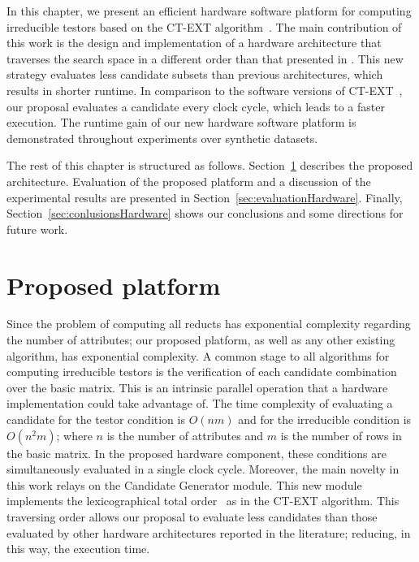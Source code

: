 \documentclass[letterpaper, twoside, openright, 12pt]{book}%
\begin{document}
	In this chapter, we present an efficient hardware software platform for computing irreducible testors based on the CT-EXT algorithm~\citep{Sanchez07}. The main contribution of this work is the design and implementation of a hardware architecture that traverses the search space in a different order than that presented in \citep{Rojas07, Rojas12,Rodriguez14}. This new strategy evaluates less candidate subsets than previous architectures, which results in shorter runtime. In comparison to the software versions of CT-EXT~\citep{Sanchez07, Sanchez10}, our proposal evaluates a candidate every clock cycle, which leads to a faster execution. The runtime gain of our new hardware software platform is demonstrated throughout experiments over synthetic datasets. 
	
	The rest of this chapter is structured as follows. Section~\ref{sec:platform} describes the proposed architecture. Evaluation of the proposed platform and a discussion of the experimental results are presented in Section~\ref{sec:evaluationHardware}. Finally, Section~\ref{sec:conlusionsHardware} shows our conclusions and some directions for future work.

%
\section{Proposed platform}\label{sec:platform}
%
	Since the problem of computing all reducts has exponential complexity regarding the number of attributes; our proposed 	platform, as well as any other existing algorithm, has exponential complexity. A common stage to all algorithms for computing irreducible testors is the verification of each candidate combination over the basic matrix. This is an intrinsic parallel operation that a hardware implementation could take advantage of. The time complexity of evaluating a candidate for the testor condition is $O(nm)$ and for the irreducible condition is $O(n^2m)$; where $n$ is the number of attributes and $m$ is the number of rows in the basic matrix. In the proposed hardware component, these conditions are simultaneously evaluated in a single clock cycle. Moreover, the main novelty in this work relays on the Candidate Generator module. This new module implements the lexicographical total order~\citep{Sanchez07} as in the CT-EXT algorithm. This traversing order allows our proposal to evaluate less candidates than those evaluated by other hardware architectures reported in the literature; reducing, in this way, the execution time.
	
\end{document}
